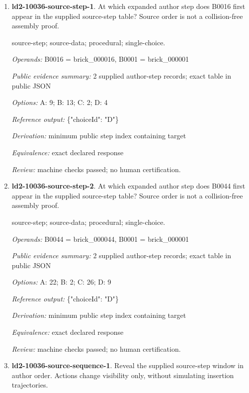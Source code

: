 \begin{enumerate}
\item \textbf{ld2-10036-source-step-1}. At which expanded author step does B0016 first appear in the supplied source-step table? Source order is not a collision-free assembly proof.
\par{\small source-step; source-data; procedural; single-choice.\par\textit{Operands:} B0016 = brick\_000016, B0001 = brick\_000001\par\textit{Public evidence summary:} 2 supplied author-step records; exact table in public JSON\par\textit{Options:} A: 9; B: 13; C: 2; D: 4\par\textit{Reference output:} \{"choiceId": "D"\}\par\textit{Derivation:} minimum public step index containing target\par\textit{Equivalence:} exact declared response\par\textit{Review:} machine checks passed; no human certification.}
\item \textbf{ld2-10036-source-step-2}. At which expanded author step does B0044 first appear in the supplied source-step table? Source order is not a collision-free assembly proof.
\par{\small source-step; source-data; procedural; single-choice.\par\textit{Operands:} B0044 = brick\_000044, B0001 = brick\_000001\par\textit{Public evidence summary:} 2 supplied author-step records; exact table in public JSON\par\textit{Options:} A: 22; B: 2; C: 26; D: 9\par\textit{Reference output:} \{"choiceId": "D"\}\par\textit{Derivation:} minimum public step index containing target\par\textit{Equivalence:} exact declared response\par\textit{Review:} machine checks passed; no human certification.}
\item \textbf{ld2-10036-source-sequence-1}. Reveal the supplied source-step window in author order. Actions change visibility only, without simulating insertion trajectories.

\end{enumerate}
